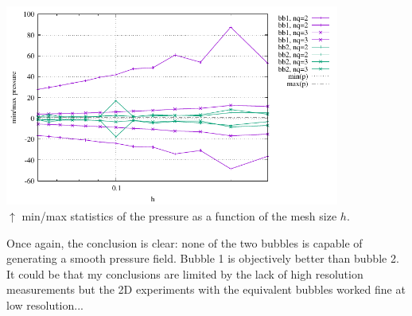 \begin{center}
\includegraphics[width=11cm]{python_codes/fieldstone_75/results/mms3D/p_stats.pdf}\\
{\captionfont $\uparrow$ min/max statistics of the pressure as a function of the mesh size $h$.}
\end{center}




Once again, the conclusion is clear: none of the two bubbles is capable of generating a 
smooth pressure field. Bubble 1 is objectively better than bubble 2.
It could be that my conclusions are limited by the lack of high resolution measurements
but the 2D experiments with the equivalent bubbles worked fine at low resolution...
